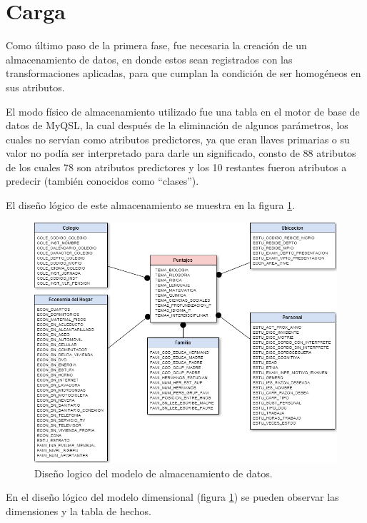 \section{Carga}
Como último paso de la primera fase, fue necesaria la creación de un almacenamiento de datos, en donde estos sean registrados con las transformaciones aplicadas, para que cumplan la condición de ser homogéneos en sus atributos.

El modo físico de almacenamiento utilizado fue una tabla en el motor de base de datos de MyQSL, la cual después de la eliminación de algunos parámetros, los cuales no servían como atributos predictores, ya que eran llaves primarias o su valor no podía ser interpretado para darle un significado, consto de 88 atributos de los cuales 78 son atributos predictores y los 10 restantes fueron atributos a predecir (también conocidos como ``clases'').

El diseño lógico de este almacenamiento se muestra en la figura \ref{fig:figura2}.

\begin{figure}[!htb]
\begin{centering}
\includegraphics[scale=0.65]{datamart}
\par\end{centering}
\caption{Diseño logico del modelo de almacenamiento de datos.}
\label{fig:figura2}
\end{figure}
En el diseño lógico del modelo dimensional (figura \ref{fig:figura2}) se pueden observar las dimensiones y la tabla de hechos.

